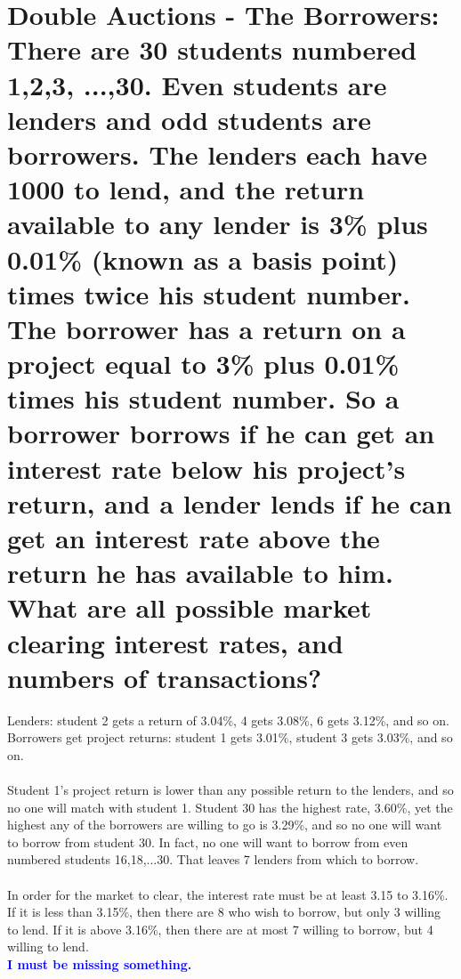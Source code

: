 \documentclass[]{article}
\newcommand{\fix} [1] {\textbf{\textcolor{blue}{#1}}} %
\begin{document}
\section{Double Auctions - The Borrowers: There are 30 students numbered 1,2,3, ...,30. Even students are lenders and odd students are borrowers. The lenders each have 1000 to lend, and the return available to any lender is 3\% plus 0.01\% (known as a basis point) times twice his student number.  The borrower has a return on a project equal to 3\% plus 0.01\% times his student number.  So a borrower borrows if he can get an interest rate below his project's return, and a lender lends if he can get an interest rate above the return he has available to him.  What are all possible market clearing interest rates, and numbers of transactions?}
Lenders: student 2 gets a return of 3.04\%, 4 gets 3.08\%, 6 gets 3.12\%, and so on. Borrowers get project returns: student 1 gets 3.01\%, student 3 gets 3.03\%, and so on. \\
\\
Student 1's project return is lower than any possible return to the lenders, and so no one will match with student 1. Student 30 has the highest rate, 3.60\%, yet the highest any of the borrowers are willing to go is 3.29\%, and so no one will want to borrow from student 30. In fact, no one will want to borrow from even numbered students 16,18,...30.  That leaves 7 lenders from which to borrow. \\
\\
In order for the market to clear, the interest rate must be at least 3.15 to 3.16\%. If it is less than 3.15\%, then there are 8 who wish to borrow, but only 3 willing to lend. If it is above 3.16\%, then there are at most 7 willing to borrow, but 4 willing to lend. \\
\fix{I must be missing something.}
\end{document}

